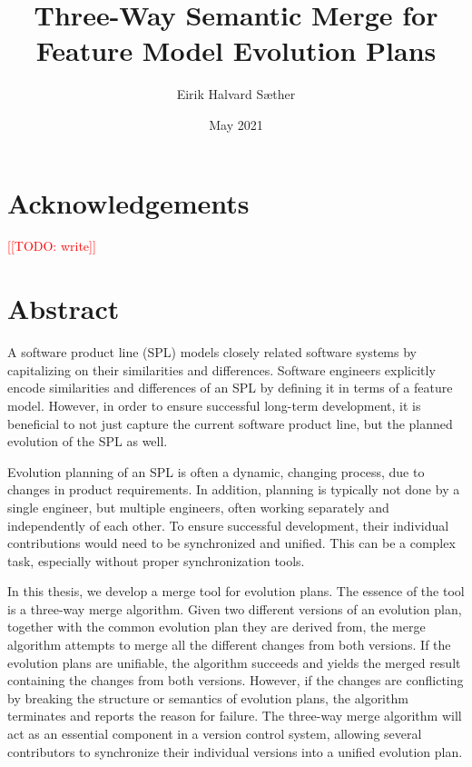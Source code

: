 \documentclass[a4paper,english]{ifimaster}
\title{Three-Way Semantic Merge for Feature Model Evolution Plans}
\date{May 2021}
\author{Eirik Halvard Sæther}
\newcommand{\todo}[1]{\textcolor{red}{[[TODO: #1]]}\PackageWarning{TODO:}{#1!}}
\begin{document}
\duoforside[dept={Department of Informatics},
program={Informatics: Programming and Systems Architecture},
long]
\frontmatter{}

\chapter*{Acknowledgements}

\todo{write}





\newpage
\thispagestyle{empty}
\mbox{}
\chapter*{Abstract}

A software product line (SPL) models closely related software systems by capitalizing on their similarities and differences. Software engineers explicitly encode similarities and differences of an SPL by defining it in terms of a feature model. However, in order to ensure successful long-term development, it is beneficial to not just capture the current software product line, but the planned evolution of the SPL as well.

Evolution planning of an SPL is often a dynamic, changing process, due to changes in product requirements. In addition, planning is typically not done by a single engineer, but multiple engineers, often working separately and independently of each other. To ensure successful development, their individual contributions would need to be synchronized and unified. This can be a complex task, especially without proper synchronization tools.

In this thesis, we develop a merge tool for evolution plans. The essence of the tool is a three-way merge algorithm. Given two different versions of an evolution plan, together with the common evolution plan they are derived from, the merge algorithm attempts to merge all the different changes from both versions. If the evolution plans are unifiable, the algorithm succeeds and yields the merged result containing the changes from both versions. However, if the changes are conflicting by breaking the structure or semantics of evolution plans, the algorithm terminates and reports the reason for failure. The three-way merge algorithm will act as an essential component in a version control system, allowing several contributors to synchronize their individual versions into a unified evolution plan.
\end{document}
